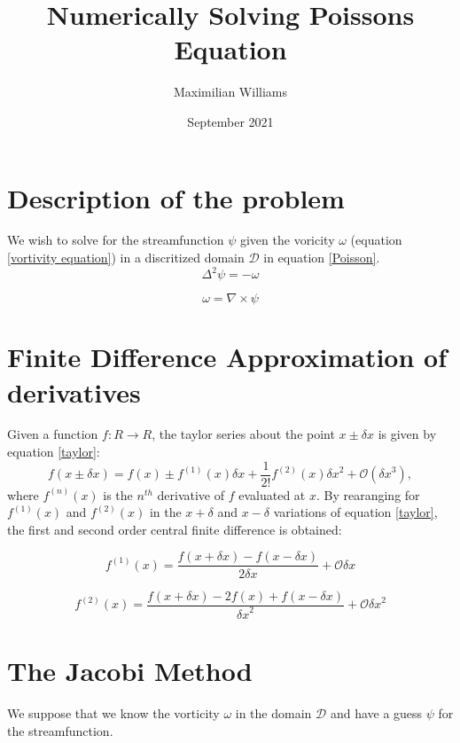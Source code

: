 \documentclass{article}
\title{Numerically Solving Poissons Equation}
\author{Maximilian Williams}
\date{September 2021}
\begin{document}
\maketitle


\section*{Description of the problem}

We wish to solve for the streamfunction $\psi$ given the voricity $\omega$ (equation \ref{vortivity equation}) in a discritized domain $\mathcal{D}$ in equation \ref{Poisson}.
\begin{equation}
	\Delta^2 \psi = -\omega
	\label{Poisson}
\end{equation}

\begin{equation}
	\omega = \nabla \times \psi
	\label{vorticity equation}
\end{equation}


\section*{Finite Difference Approximation of derivatives}
Given a function $f:R\rightarrow R$, the taylor series about the point $x\pm \delta x$ is given by equation \ref{taylor}:
\begin{equation}
	f(x \pm \delta x) = f(x) \pm  f^{(1)}(x) \delta x + \frac{1}{2!} f^{(2)}(x) {\delta x}^2 + \mathcal{O}({\delta x}^3),
	\label{taylor}
\end{equation}
where $f^{(n)}(x)$ is the $n^{th}$ derivative of $f$ evaluated at $x$. By rearanging for $f^{(1)}(x)$ and $f^{(2)}(x)$ in the $x+\delta$ and $x-\delta$ variations of equation \ref{taylor}, the first and second order central finite difference is obtained:

\begin{equation}
	f^{(1)}(x) = \frac{f(x+\delta x) - f(x - \delta x)}{2 \delta x} + \mathcal{O}{\delta x}
	\label{first order central difference}
\end{equation}

\begin{equation}
	f^{(2)}(x) = \frac{f(x+\delta x) - 2 f(x) + f(x - \delta x)}{ {\delta x}^2 } + \mathcal{O}{\delta x}^2
	\label{second order central difference}
\end{equation}

\section*{The Jacobi Method}
We suppose that we know the vorticity $\omega$ in the domain $\mathcal{D}$ and have a guess $\psi$ for the streamfunction. 
\end{document}
